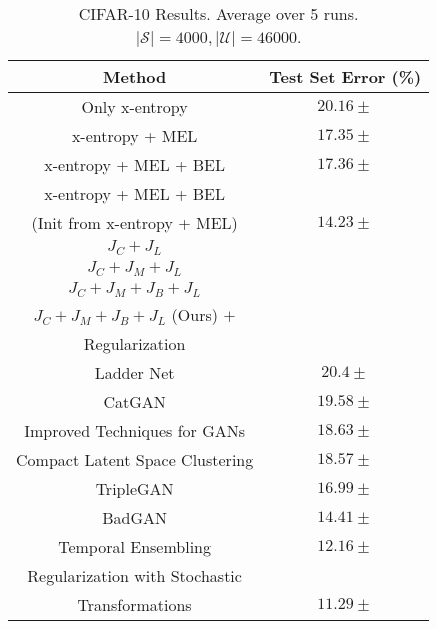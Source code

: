 \begin{table}
		\centering
		\resizebox{0.5\textwidth}{!}
		{
		\begin{tabular}{|c|c|}
			\hline
			\textbf{Method} & \textbf{Test Set Error (\%)}\\
			\hline
			Only x-entropy & $20.16 \pm $\\
			\hline
			x-entropy + MEL & $17.35 \pm $\\
			\hline
			x-entropy + MEL + BEL & $17.36 \pm $\\
			\hline
			x-entropy + MEL + BEL & \\
			(Init from x-entropy + MEL) & $14.23 \pm $\\
			\hline
			$J_C + J_L$  & \\
			\hline
			$J_C + J_M + J_L$  & \\
			\hline
			$J_C + J_M + J_B + J_L$  & \\
			\hline
			$J_C + J_M + J_B + J_L$ (Ours) $+$  & \\
			Regularization \cite{Sajjadi2016a}  & \\

			\hline
			\hline
			Ladder Net \cite{Rasmus2015} & $20.4 \pm $\\
			\hline
			CatGAN \cite{Springenberg2015} & $19.58 \pm $\\
			\hline
			Improved Techniques for GANs & $18.63 \pm $\\
			\hline
			Compact Latent Space Clustering \cite{Kamnitsas2018} & $18.57 \pm $\\
			\hline
			TripleGAN \cite{Li2017} & $16.99 \pm $\\
			\hline
			BadGAN \cite{Dai2017} & $14.41 \pm $\\
			\hline
			Temporal Ensembling \cite{Laine2016} & $12.16 \pm $\\
			\hline
			Regularization with Stochastic & \\
			Transformations \cite{Sajjadi2016a} & $\mathbf{11.29 \pm }$\\
			\hline
		\end{tabular}
		}
		\caption{CIFAR-10 Results. Average over 5 runs. $|\mathcal{S}| = 4000, |\mathcal{U}| = 46000$.}
		\label{tab:cifar_results}
\end{table}
